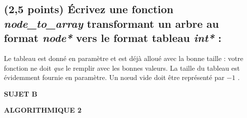 \documentclass[11pt,a4paper]{article}
\newcommand{\TitreMatiere}{Algorithmique 2}
\begin{document}
\clearpage


\subsection{(2,5 points) \'Ecrivez une fonction \og \textit{node\_to\_array} \fg{} transformant un arbre au format \textit{node*} vers le format tableau \textit{int*} : }

\noindent Le tableau est donné en paramètre et est déjà alloué avec la bonne taille : votre fonction ne doit \textit{que} le remplir avec les bonnes valeurs.
La taille du tableau est évidemment fournie en paramètre.
Un nœud vide doit être représenté par \og $-1$ \fg.

\begin{center}
\end{center}




\clearpage




\vfillFirst

\begin{center}

\begin{LARGE}
\textbf{SUJET B}

\bigskip

\textbf{\MakeUppercase{\TitreMatiere}}
\end{LARGE}

\end{center}

\vfillLast
\end{document}
